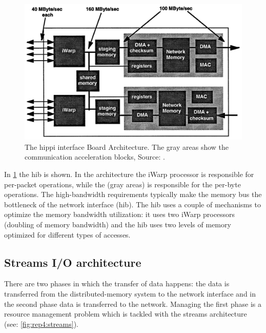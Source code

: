 \begin{figure}
    \centering
	\includegraphics[width=0.95\linewidth]{Figures/Rep4hib.png}
	\caption{The \ac{hippi} interface Board Architecture. The gray areas show the communication acceleration blocks, Source: \cite{steenkiste1997high}.}
    \label{fig:rep4:hib}
\end{figure}

In \cref{fig:rep4:hib} the \ac{hib} is shown.
In the architecture the iWarp processor is responsible for per-packet operations, while the  (gray areas) is responsible for the per-byte operations.
The high-bandwidth requirements typically make the memory bus the bottleneck of the network interface (\ac{hib}).
The \ac{hib} uses a couple of mechanisms to optimize the memory bandwidth utilization: it uses two iWarp processors (doubling of memory bandwidth) and the \ac{hib} uses two levels of memory optimized for different types of accesses.


\subsection{Streams I/O architecture}
There are two phases in which the transfer of data happens: the data is transferred from the distributed-memory system to the network interface and in the second phase data is transferred to the network.
Managing the first phase is a resource management problem which is tackled with the streams architecture (see: \cref{fig:rep4:streams}).

